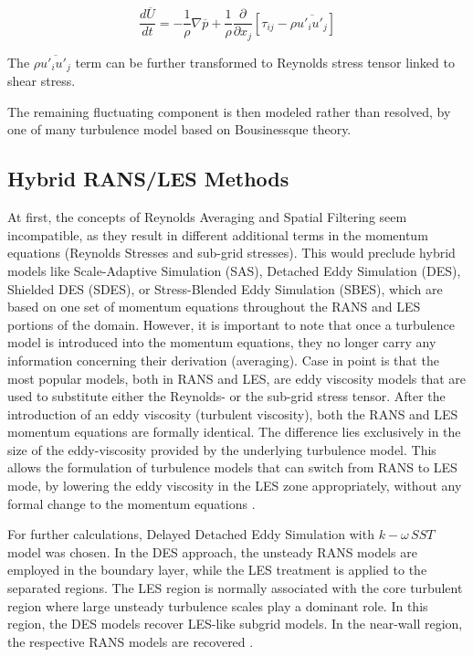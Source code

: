 \begin{equation} \label{eq:RANSmomentum2}
\frac{d \overline{U}}{dt}
=
- \frac{1}{\rho} \nabla \overline{p}
+ \frac{1}{\rho} \frac{\partial}{\partial x_j} \left[ \tau_{ij} - \rho \overline{u'_i u'_j} \right]
\end{equation}

The $\rho \overline{u'_i u'_j}$ term can be further transformed to Reynolds stress tensor linked to shear stress.

The remaining fluctuating component is then modeled rather than resolved, by one of many turbulence model based on Bousinessque theory.

\subsection{Hybrid RANS/LES Methods}
At first, the concepts of Reynolds Averaging and Spatial Filtering seem incompatible, as they result in different additional terms in the momentum equations (Reynolds Stresses and sub-grid stresses). This would preclude hybrid models like Scale-Adaptive Simulation (SAS), Detached Eddy Simulation (DES), Shielded DES (SDES), or Stress-Blended Eddy Simulation (SBES), which are based on one set of momentum equations throughout the RANS and LES portions of the domain. However, it is important to note that once a turbulence model is introduced into the momentum equations, they no longer carry any information concerning their derivation (averaging). Case in point is that the most popular models, both in RANS and LES, are eddy viscosity models that are used to substitute either the Reynolds- or the sub-grid stress tensor. After the introduction of an eddy viscosity (turbulent viscosity), both the RANS and LES momentum equations are formally identical. The difference lies exclusively in the size of the eddy-viscosity provided by the underlying turbulence model. This allows the formulation of turbulence models that can switch from RANS to LES mode, by lowering the eddy viscosity in the LES zone appropriately, without any formal change to the momentum equations \citep{fluenttheory}.

For further calculations, Delayed Detached Eddy Simulation with $k-\omega \, SST$ model was chosen. In the DES approach, the unsteady RANS models are employed in the boundary layer, while the LES treatment is applied to the separated regions. The LES region is normally associated with the core turbulent region where large unsteady turbulence scales play a dominant role. In this region, the DES models recover LES-like subgrid models. In the near-wall region, the respective RANS models are recovered \citep{fluenttheory}.

